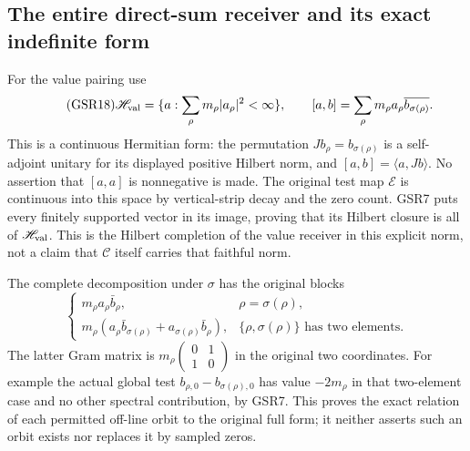 \subsection{The entire direct-sum receiver and its exact indefinite form}

For the value pairing use
\begin{equation}\tag{GSR18}
 \mathscr H_{\rm val}
    =\{a:\sum_\rho m_\rho|a_\rho|^2<\infty\},
 \qquad
 [a,b]=\sum_\rho m_\rho a_\rho
                              \overline{b_{\sigma(\rho)}} .
\end{equation}
This is a continuous Hermitian form:
the permutation $Jb_\rho=b_{\sigma(\rho)}$
is a self-adjoint unitary for its
displayed positive Hilbert norm,
and $[a,b]=\langle a,Jb\rangle$.
No assertion that $[a,a]$ is
nonnegative is made. The original
test map $\mathcal E$ is continuous
into this space by vertical-strip
decay and the zero count. GSR7
puts every finitely supported
vector in its image, proving
that its Hilbert closure is all
of $\mathscr H_{\rm val}$.
This is the Hilbert completion of
the value receiver in this
explicit norm, not a claim
that $\mathcal C$ itself carries
that faithful norm.

The complete decomposition under
$\sigma$ has the original blocks
\begin{equation}\tag{GSR19}
 \begin{cases}
 m_\rho a_\rho\bar b_\rho,
        &\rho=\sigma(\rho),\\
 m_\rho(a_\rho\bar b_{\sigma(\rho)}
       +a_{\sigma(\rho)}\bar b_\rho),
        &\{\rho,\sigma(\rho)\}\text{ has two elements}.
 \end{cases}
\end{equation}
The latter Gram matrix is
$m_\rho\begin{pmatrix}0&1\\1&0\end{pmatrix}$
in the original two coordinates.
For example the actual global
test $b_{\rho,0}-b_{\sigma(\rho),0}$
has value $-2m_\rho$ in that
two-element case and no other
spectral contribution, by GSR7.
This proves the exact relation of
each permitted off-line orbit to
the original full form; it neither
asserts such an orbit exists nor
replaces it by sampled zeros.

